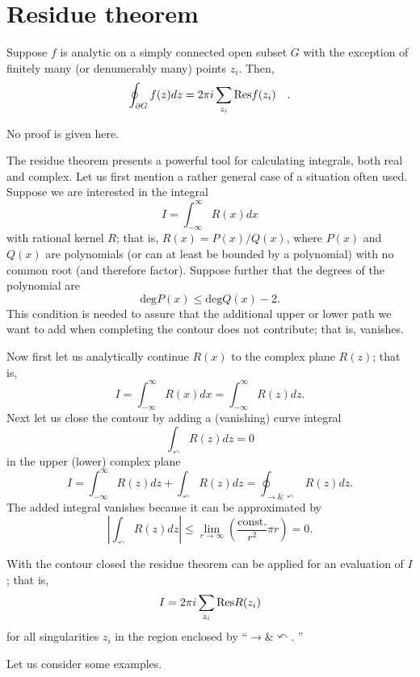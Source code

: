  \section{Residue theorem}


Suppose $f$ is analytic on a  simply connected open subset $G$
with the exception of finitely many (or denumerably many) points  $z_i$.
Then,
\begin{equation}
\oint_{\partial G} f(z)dz=2\pi i \sum_{z_i} {\rm Res}f(z_i)\quad .
\end{equation}


 No proof is given here.

The residue theorem presents a powerful tool for calculating integrals, both real and complex.
Let us first mention a rather general case of a situation often used.
Suppose we are interested in the integral
  $$I=\int_{-\infty}^{\infty} R(x) dx$$
with rational kernel $R$; that is, $R(x)= P(x)/Q(x)$,
where $P(x)$ and $Q(x)$
are polynomials (or can at least be bounded by a polynomial) with no common root (and therefore factor).
Suppose further that the degrees of the polynomial are
$$
\textrm{deg} P(x) \le
\textrm{deg} Q(x) -2.
$$
This condition is needed to assure that the additional upper or lower path we want to add when completing the contour
does not contribute; that is, vanishes.

Now first let us analytically continue $R(x)$ to the complex plane $R(z)$; that is,
$$I=\int_{-\infty}^{\infty} R(x) dx =\int_{-\infty}^{\infty} R(z) dz.$$
Next let us close the contour by adding a (vanishing) curve integral
$$\int_{\curvearrowleft} R(z) dz =
0$$
in the upper (lower) complex plane
$$I=\int_{-\infty}^{\infty} R(z) dz +\int_{\curvearrowleft} R(z) dz=\oint_{\rightarrow \& \curvearrowleft} R(z) dz.$$
The added integral vanishes because
it can be approximated by
$$\left| \int_{\curvearrowleft} R(z)  dz\right| \le \lim_{r\rightarrow \infty} \left(\frac{\textrm{const.}}{r^2} \pi r \right) =0.$$

With the contour closed the residue theorem can be applied  for an evaluation of $I$; that is,
$$I= 2\pi i \sum_{z_i} {\rm Res}R(z_i)$$
for all singularities $z_i$ in the region enclosed by ``$\rightarrow \& \curvearrowleft$. ''

Let us consider some examples.

